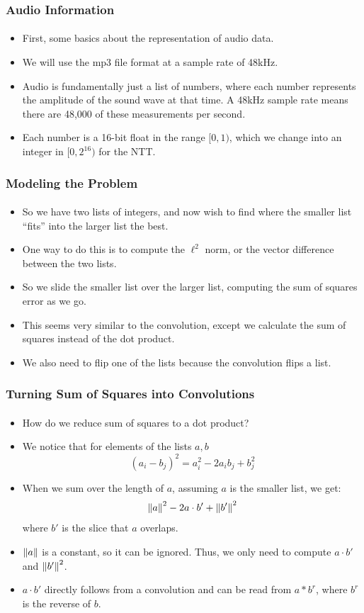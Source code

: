 \documentclass{beamer}                             %
\begin{document}
\begin{frame}
\frametitle{Audio Information}
\framesubtitle{}
\begin{itemize}[<+->]
  \item First, some basics about the representation of audio data.
  \item We will use the mp3 file format at a sample rate of 48kHz.
  \item Audio is fundamentally just a list of numbers, where each number
    represents the amplitude of the sound wave at that time. A 48kHz
    sample rate means there are 48,000 of these measurements per second.
  \item Each number is a 16-bit float in the range \( [0, 1) \), which we
    change into an integer in \( [0, 2^{16}) \) for the NTT.
\end{itemize}
\end{frame}

\begin{frame}
\frametitle{Modeling the Problem}
\framesubtitle{}
\begin{itemize}
  \item So we have two lists of integers, and now wish to find where
    the smaller list \enquote{fits} into the larger list the best. \pause
  \item One way to do this is to compute the \alert{\( \ell^2 \) norm},
    or the vector difference between the two lists. \pause
  \item So we slide the smaller list over the larger
    list, computing the sum of squares error as we go.
  \item This seems very similar to the convolution, except we
    calculate the sum of squares instead of the dot product.
  \item We also need to flip one of the lists
    because the convolution flips a list.
\end{itemize}
\end{frame}

\begin{frame}
\frametitle{Turning Sum of Squares into Convolutions}
\framesubtitle{}
\begin{itemize}[<+->]
  \item How do we reduce sum of squares to a dot product?
  \item We notice that for elements of the lists \( a, b \)
    \[ (a_i - b_j)^2 = a_i^2 - 2a_i b_j + b_j^2 \]
  \item When we sum over the length of \( a \),
    assuming \( a \) is the smaller list, we get:
    \[ \norm{a}^2 - 2 a \cdot b' + \norm{b'}^2 \]
    where \( b' \) is the slice that \( a \) overlaps.
  \item \( \norm{a} \) is a constant, so it can be ignored.
    Thus, we only need to compute \( a \cdot b' \) and \( \norm{b'}^2 \).
  \item \( a \cdot b' \) directly follows from a convolution and
    can be read from \( a * b^r \), where \( b^r \) is the reverse of \( b \).
\end{itemize}
\end{frame}
\end{document}
